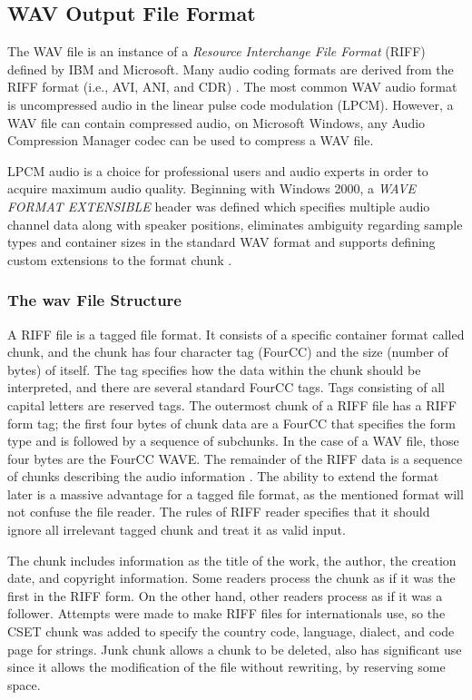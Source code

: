 \documentclass[runningheads]{llncs}
\begin{document}
\subsection{WAV Output File Format} 
\label{sec:wav}

The WAV file is an instance of a \textit{Resource Interchange File Format} (RIFF) defined by IBM and Microsoft. Many audio coding formats are derived from the RIFF format (i.e., AVI, ANI, and CDR) \cite{wav}.
The most common WAV audio format is uncompressed audio in the linear pulse code modulation (LPCM). However, a WAV file can contain compressed audio, on Microsoft Windows, any Audio Compression Manager codec can be used to compress a WAV file. 

LPCM audio is a choice for professional users and audio experts in order to acquire maximum audio quality.
Beginning with Windows 2000, a \textit{WAVE FORMAT EXTENSIBLE} header was defined which 
specifies multiple audio channel data along with speaker positions, eliminates ambiguity 
regarding sample types and container sizes in the standard WAV format and supports defining 
custom extensions to the format chunk \cite{pcm}.

\subsubsection{The wav File Structure}

A RIFF file is a tagged file format. It consists of a specific container format called chunk, and the chunk has four character tag (FourCC)
and the size (number of bytes) of itself. The tag specifies how the data within the chunk should be interpreted, and there are several standard FourCC tags. Tags consisting of all capital letters are reserved tags. The outermost chunk of a RIFF file
has a RIFF form tag; the first four bytes of chunk data are a FourCC that specifies the form type and is followed by a sequence of subchunks. In the case of a WAV file, those four bytes are the FourCC WAVE. The remainder of the RIFF data is a sequence of chunks describing the audio information \cite{wav}.
The ability to extend the format later is a massive advantage for a tagged file format, as the mentioned format will not confuse the file reader. The rules of RIFF reader specifies that it should ignore all irrelevant tagged chunk and treat it as valid input. 

The chunk includes information as the title of the work, the author, the creation date, and copyright information. Some readers process the chunk as if it was the first in the RIFF form. On the other hand, other readers process as if it was a follower.
Attempts were made to make RIFF files for internationals use, so the CSET chunk was added to specify the country code, language, dialect, and code page for strings.
Junk chunk allows a chunk to be deleted, also has significant use since it allows the modification of the file without rewriting, by reserving some space.
\end{document}
